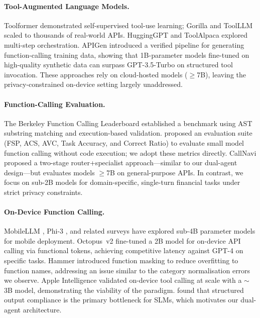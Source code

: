 \documentclass[11pt,twocolumn]{article}
\begin{document}
\paragraph{Tool-Augmented Language Models.}
Toolformer \citep{schick2024toolformer} demonstrated self-supervised
tool-use learning; Gorilla \citep{patil2023gorilla} and ToolLLM
\citep{qin2023toolllm} scaled to thousands of real-world APIs.
HuggingGPT \citep{shen2024hugginggpt} and ToolAlpaca
\citep{tang2024toolalpaca} explored multi-step orchestration.
APIGen \citep{liu2024apigen} introduced a verified pipeline for
generating function-calling training data, showing that 1B-parameter
models fine-tuned on high-quality synthetic data can surpass
GPT-3.5-Turbo on structured tool invocation.
These approaches rely on cloud-hosted models ($\ge$7B), leaving the
privacy-constrained on-device setting largely unaddressed.

\paragraph{Function-Calling Evaluation.}
The Berkeley Function Calling Leaderboard \citep{yan2024bfcl}
established a benchmark using AST substring matching and
execution-based validation.
\citet{kavathekar2025small} proposed an evaluation suite (FSP, ACS,
AVC, Task Accuracy, and Correct Ratio) to evaluate small model
function calling without code execution; we adopt these metrics
directly.
CallNavi \citep{callnavi2025} proposed a two-stage router+specialist
approach---similar to our dual-agent design---but evaluates models
$\geq$7B on general-purpose APIs.
In contrast, we focus on sub-2B models for domain-specific,
single-turn financial tasks under strict privacy constraints.

\paragraph{On-Device Function Calling.}
MobileLLM \citep{liu2024mobilellm}, Phi-3 \citep{abdin2024phi3}, and
related surveys \citep{xu2024ondevice} have explored sub-4B parameter
models for mobile deployment.
Octopus~v2 \citep{chen2024octopus} fine-tuned a 2B model for
on-device API calling via functional tokens, achieving competitive
latency against GPT-4 on specific tasks.
Hammer \citep{lin2024hammer} introduced function masking to reduce
overfitting to function names, addressing an issue similar to the
category normalisation errors we observe.
Apple Intelligence \citep{gunter2024apple} validated on-device tool
calling at scale with a $\sim$3B model, demonstrating the viability
of the paradigm.
\citet{kavathekar2025small} found that structured output compliance is
the primary bottleneck for SLMs, which motivates our dual-agent
architecture.
\end{document}
